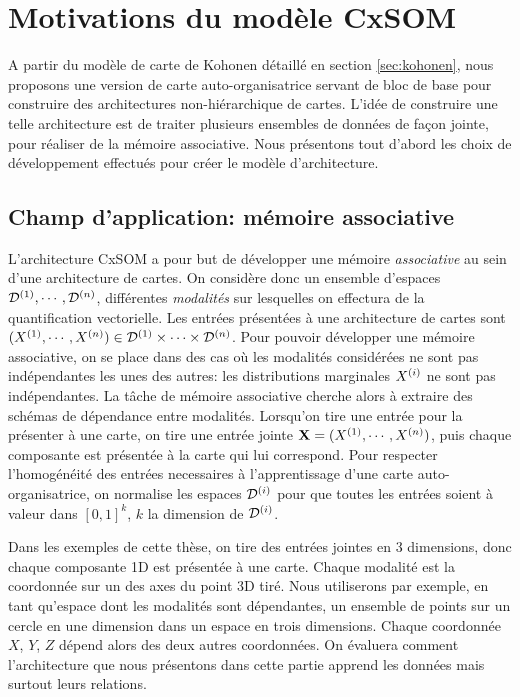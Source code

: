 \section{Motivations du modèle CxSOM}
A partir du modèle de carte de Kohonen détaillé en section \ref{sec:kohonen}, nous proposons une version de carte auto-organisatrice servant de bloc de base pour construire des architectures non-hiérarchique de cartes. L'idée de construire une telle architecture est de traiter plusieurs ensembles de données de façon jointe, pour réaliser de la mémoire associative.
Nous présentons tout d'abord les choix de développement effectués pour créer le modèle d'architecture.

\subsection{Champ d'application: mémoire associative}
L'architecture CxSOM a pour but de développer une mémoire \emph{associative} au sein d'une architecture de cartes. On considère donc un ensemble d'espaces $\mathcal{D}^{({1})}, \cdots , \mathcal{D}^{({n})}$, différentes \emph{modalités} sur lesquelles on effectura de la quantification vectorielle. Les entrées présentées à une architecture de cartes sont $(X^{({1})}, \cdots, X^{({n})}) \in \mathcal{D}^{({1})} \times \cdots \times \mathcal{D}^{({n})}$. Pour pouvoir développer une mémoire associative, on se place dans des cas où les modalités considérées ne sont pas indépendantes les unes des autres: les distributions marginales $X^{({i})}$ ne sont pas indépendantes. La tâche de mémoire associative cherche alors à extraire des schémas de dépendance entre modalités. Lorsqu'on tire une entrée pour la présenter à une carte, on tire une entrée jointe $\mathbf{X} =  (X^{({1})}, \cdots , X^{({n})})$, puis chaque composante est présentée à la carte qui lui correspond. Pour respecter l'homogénéité des entrées necessaires à l'apprentissage d'une carte auto-organisatrice, on normalise les espaces $\mathcal{D}^{({i})}$ pour que toutes les entrées soient à valeur dans $[0,1]^k$, $k$ la dimension de $\mathcal{D}^{({i})}$.

Dans les exemples de cette thèse, on tire des entrées jointes en 3 dimensions, donc chaque composante 1D est présentée à une carte. Chaque modalité est la coordonnée sur un des axes du point 3D tiré. Nous utiliserons par exemple, en tant qu'espace dont les modalités sont dépendantes, un ensemble de points sur un cercle en une dimension dans un espace en trois dimensions. Chaque coordonnée $X$, $Y$, $Z$ dépend alors des deux autres coordonnées. On évaluera comment l'architecture que nous présentons dans cette partie apprend les données mais surtout leurs relations. 

